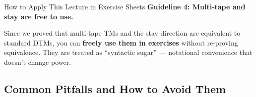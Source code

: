 \begin{examplebox}{How to Apply This Lecture in Exercise Sheets}
\textbf{Guideline 4: Multi-tape and stay are free to use.}

Since we proved that multi-tape TMs and the stay direction are equivalent to standard DTMs, you can \textbf{freely use them in exercises} without re-proving equivalence. They are treated as ``syntactic sugar'' --- notational convenience that doesn't change power.
\end{examplebox}

\subsection{Common Pitfalls and How to Avoid Them}

